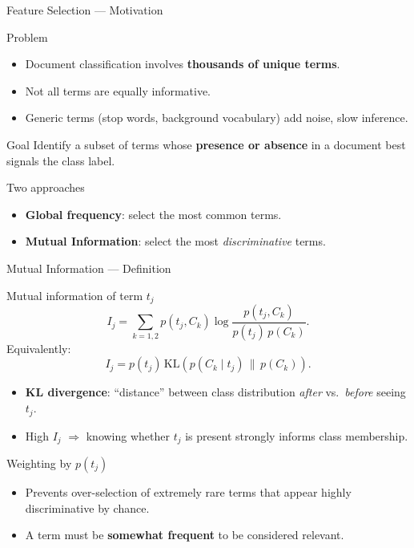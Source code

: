 \begin{frame}{Feature Selection — Motivation}
  \begin{block}{Problem}
    \begin{itemize}
      \item Document classification involves \textbf{thousands of unique terms}.
      \item Not all terms are equally informative.
      \item Generic terms (stop words, background vocabulary) add noise, slow inference.
    \end{itemize}
  \end{block}

  \begin{block}{Goal}
    Identify a subset of terms whose \textbf{presence or absence} in a document best signals
    the class label.
  \end{block}

  \begin{alertblock}{Two approaches}
    \begin{itemize}
      \item \textbf{Global frequency}: select the most common terms.
      \item \textbf{Mutual Information}: select the most \emph{discriminative} terms.
    \end{itemize}
  \end{alertblock}
\end{frame}

\begin{frame}{Mutual Information — Definition}
  \begin{block}{Mutual information of term $t_j$}
    \[
      I_j=\sum_{k=1,2}p(t_j,C_k)\log\frac{p(t_j,C_k)}{p(t_j)\,p(C_k)}.
    \]
    Equivalently:
    \[
      I_j=p(t_j)\,\mathrm{KL}\!\left(p(C_k\mid t_j)\,\|\,p(C_k)\right).
    \]
    \begin{itemize}
      \item \textbf{KL divergence}: ``distance'' between class distribution \emph{after} vs.\
            \emph{before} seeing $t_j$.
      \item High $I_j$ $\Rightarrow$ knowing whether $t_j$ is present strongly informs class membership.
    \end{itemize}
  \end{block}

  \begin{block}{Weighting by $p(t_j)$}
    \begin{itemize}
      \item Prevents over-selection of extremely rare terms that appear highly discriminative by chance.
      \item A term must be \textbf{somewhat frequent} to be considered relevant.
    \end{itemize}
  \end{block}
\end{frame}

